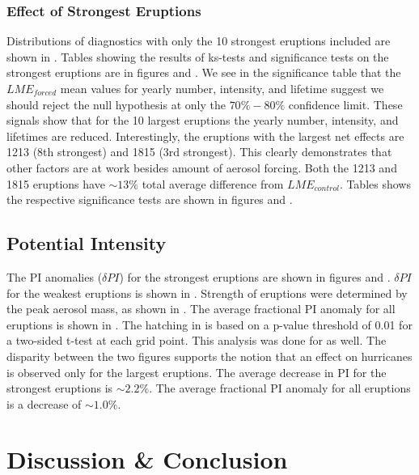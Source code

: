 \documentclass[phd,tocprelim]{cornell}
\begin{document}
\subsubsection{Effect of Strongest Eruptions}
Distributions of diagnostics with only the 10 strongest eruptions
included are shown in . Tables showing the
results of ks-tests and significance tests on the strongest eruptions
are in figures  and . We see in the
significance table that the $LME_{forced}$ mean values for yearly
number, intensity, and lifetime suggest we should reject the null
hypothesis at only the $70\%-80\%$ confidence limit. These signals
show that for the 10 largest eruptions the yearly number, intensity,
and lifetimes are reduced. Interestingly, the eruptions with the
largest net effects are 1213 (8th strongest) and 1815 (3rd
strongest). This clearly demonstrates that other factors are at work
besides amount of aerosol forcing. Both the 1213 and 1815 eruptions
have ${\sim}13\%$ total average difference from
$LME_{control}$. Tables shows the respective significance tests are
shown in figures  and .

\subsection{Potential Intensity}
The PI anomalies ($\delta PI$) for the strongest eruptions are shown 
in figures  and . $\delta PI$ for the 
weakest eruptions is shown in . Strength of eruptions 
were determined by the peak aerosol mass, as shown in 
. The average fractional PI anomaly for all 
eruptions is shown in . The hatching in 
 is based on a p-value threshold of 0.01 for 
a two-sided t-test at each grid point. This analysis was done for 
 as well. The disparity between the two figures 
supports the notion that an effect on hurricanes is observed only 
for the largest eruptions. The average decrease in PI for the 
strongest eruptions is ${\sim}2.2\%$. The average fractional PI 
anomaly for all eruptions is a decrease of ${\sim}1.0\%$.   

\section{Discussion \& Conclusion}\label{discuss}
\end{document}
